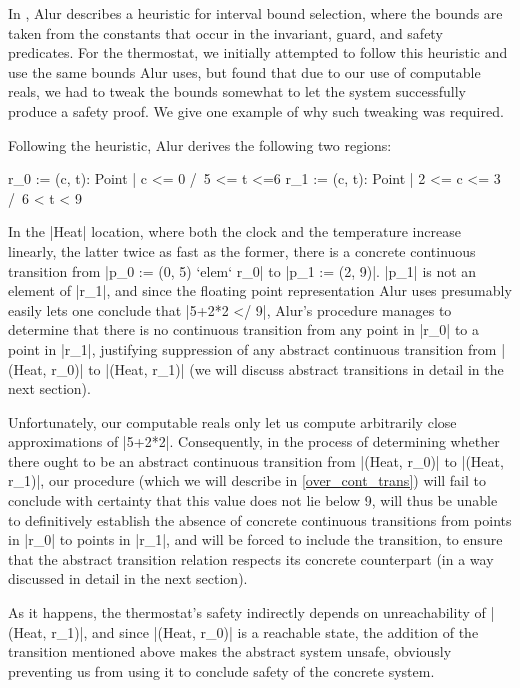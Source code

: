 \documentclass[runningheads]{llncs}
\begin{document}
In \cite{alur}, Alur describes a heuristic for interval bound selection, where the bounds are taken from the constants that occur in the invariant, guard, and safety predicates. For the thermostat, we initially attempted to follow this heuristic and use the same bounds Alur uses, but found that due to our use of computable reals, we had to tweak the bounds somewhat to let the system successfully produce a safety proof. We give one example of why such tweaking was required.

Following the heuristic, Alur derives the following two regions:
\begin{code}
  r_0 := { (c, t): Point | c <= 0 /\ 5 <= t <=6 }
  r_1 := { (c, t): Point | 2 <= c <= 3 /\ 6 < t < 9 }
\end{code}

In the |Heat| location, where both the clock and the temperature increase linearly, the latter twice as fast as the former, there is a concrete continuous transition from |p_0 := (0, 5) `elem` r_0| to |p_1 := (2, 9)|. |p_1| is not an element of |r_1|, and since the floating point representation Alur uses presumably easily lets one conclude that |5+2*2 </ 9|, Alur's procedure manages to determine that there is no continuous transition from any point in |r_0| to a point in |r_1|, justifying suppression of any abstract continuous transition from |(Heat, r_0)| to |(Heat, r_1)| (we will discuss abstract transitions in detail in the next section).

Unfortunately, our computable reals only let us compute arbitrarily close approximations of |5+2*2|. 
Consequently, in the process of determining whether there ought to be an abstract continuous transition from |(Heat, r_0)| to |(Heat, r_1)|, our procedure (which we will describe in \ref{over_cont_trans}) will fail to conclude with certainty that this value does not lie below 9, will thus be unable to definitively establish the absence of concrete continuous transitions from points in |r_0| to points in |r_1|, and will be forced to include the transition, to ensure that the abstract transition relation respects its concrete counterpart (in a way discussed in detail in the next section).

As it happens, the thermostat's safety indirectly depends on unreachability of |(Heat, r_1)|, and since |(Heat, r_0)| is a reachable state, the addition of the transition mentioned above makes the abstract system unsafe, obviously preventing us from using it to conclude safety of the concrete system.
\end{document}
